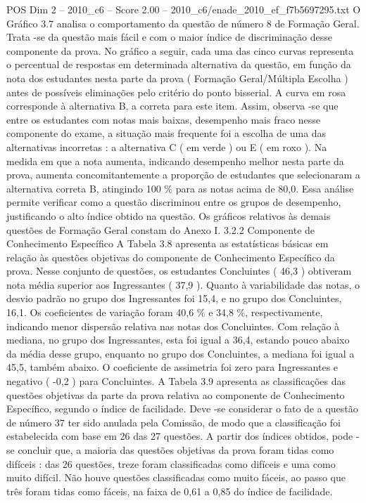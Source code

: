 \begin{textsample}{POS Dim 2 – 2010\_c6 – Score 2.00 – 2010\_c6/enade\_2010\_ef\_f7b5697295.txt}
O Gráfico 3.7 analisa o comportamento da questão de número 8 de Formação Geral.
Trata -se da questão mais fácil e com o maior índice de discriminação desse componente da prova.
No gráfico a seguir, cada uma das cinco curvas representa o percentual de respostas em determinada alternativa da questão, em função da nota dos estudantes nesta parte da prova ( Formação Geral/Múltipla Escolha ) antes de possíveis eliminações pelo critério do ponto bisserial.
A curva em rosa corresponde à alternativa B, a correta para este item.
Assim, observa -se que entre os estudantes com notas mais baixas, desempenho mais fraco nesse componente do exame, a situação mais frequente foi a escolha de uma das alternativas incorretas : a alternativa C ( em verde ) ou E ( em roxo ).
Na medida em que a nota aumenta, indicando desempenho melhor nesta parte da prova, aumenta concomitantemente a proporção de estudantes que selecionaram a alternativa correta B, atingindo 100 \% para as notas acima de 80,0.
Essa análise permite verificar como a questão discriminou entre os grupos de desempenho, justificando o alto índice obtido na questão.
Os gráficos relativos às demais questões de Formação Geral constam do Anexo I. 3.2.2 Componente de Conhecimento Específico A Tabela 3.8 apresenta as estatísticas básicas em relação às questões objetivas do componente de Conhecimento Específico da prova.
Nesse conjunto de questões, os estudantes Concluintes ( 46,3 ) obtiveram nota média superior aos Ingressantes ( 37,9 ).
Quanto à variabilidade das notas, o desvio padrão no grupo dos Ingressantes foi 15,4, e no grupo dos Concluintes, 16,1.
Os coeficientes de variação foram 40,6 \% e 34,8 \%, respectivamente, indicando menor dispersão relativa nas notas dos Concluintes.
Com relação à mediana, no grupo dos Ingressantes, esta foi igual a 36,4, estando pouco abaixo da média desse grupo, enquanto no grupo dos Concluintes, a mediana foi igual a 45,5, também abaixo.
O coeficiente de assimetria foi zero para Ingressantes e negativo ( -0,2 ) para Concluintes.
A Tabela 3.9 apresenta as classificações das questões objetivas da parte da prova relativa ao componente de Conhecimento Específico, segundo o índice de facilidade.
Deve -se considerar o fato de a questão de número 37 ter sido anulada pela Comissão, de modo que a classificação foi estabelecida com base em 26 das 27 questões.
A partir dos índices obtidos, pode -se concluir que, a maioria das questões objetivas da prova foram tidas como difíceis : das 26 questões, treze foram classificadas como difíceis e uma como muito difícil.
Não houve questões classificadas como muito fáceis, ao passo que três foram tidas como fáceis, na faixa de 0,61 a 0,85 do índice de facilidade.

\end{textsample}
